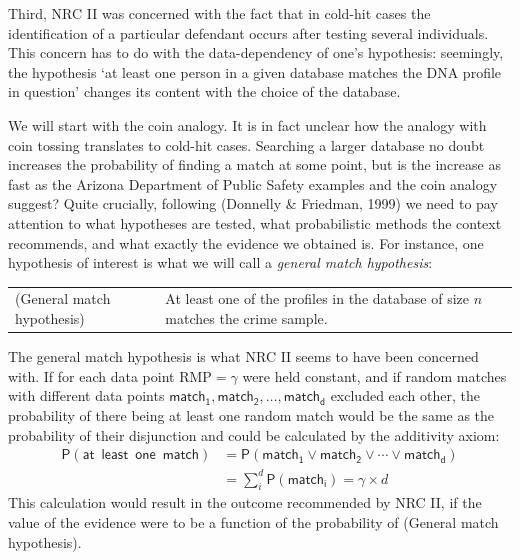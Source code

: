 \documentclass[
  10pt,
  dvipsnames,enabledeprecatedfontcommands]{scrartcl}
\newcommand{\pr}[1]{\mathsf{P}(#1)}
\begin{document}
Third, NRC II was concerned with the fact that in cold-hit cases the
identification of a particular defendant occurs after testing several
individuals. This concern has to do with the data-dependency of one's
hypothesis: seemingly, the hypothesis `at least one person in a given
database matches the DNA profile in question' changes its content with
the choice of the database.

We will start with the coin analogy. It is in fact unclear how the
analogy with coin tossing translates to cold-hit cases. Searching a
larger database no doubt increases the probability of finding a match at
some point, but is the increase as fast as the Arizona Department of
Public Safety examples and the coin analogy suggest? Quite crucially,
following (Donnelly \& Friedman, 1999) we need to pay attention to what
hypotheses are tested, what probabilistic methods the context
recommends, and what exactly the evidence we obtained is. For instance,
one hypothesis of interest is what we will call a
\emph{general match hypothesis}: \vspace{1mm}

\begin{tabular}{lp{8cm}}
(General match hypothesis) &
At least one of the profiles in the database of size $n$ 
matches the crime sample.
\end{tabular}
\vspace{1mm}

\noindent The general match hypothesis is what NRC II seems to have been
concerned with. If for each data point RMP\(=\gamma\) were held
constant, and if random matches with different data points
\(\mathsf{match_1, match_2, \dots, match_d}\) excluded each other, the
probability of there being at least one random match would be the same
as the probability of their disjunction and could be calculated by the
additivity axiom: \begin{align*}
\pr{\mathsf{at\,\,\, least\,\,\, one\,\,\, match}} & = \pr{\mathsf{match_1} \vee \mathsf{match_2} \vee \cdots \vee \mathsf{match_d}} \\
& = \sum_{i}^d \pr{\mathsf{match_i}} = \gamma \times d
\end{align*} This calculation would result in the outcome recommended by
NRC II, if the value of the evidence were to be a function of the
probability of (General match hypothesis).
\end{document}
